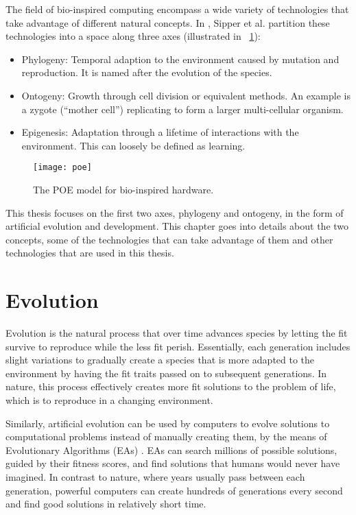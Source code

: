The field of bio-inspired computing encompass a wide variety of technologies that take advantage of different natural concepts.
In \cite{sipper1997poe}, Sipper et al. partition these technologies into a space along three axes (illustrated in \figurename~\ref{fig:poe}):

\begin{itemize}
    \item
    Phylogeny:
    Temporal adaption to the environment caused by mutation and reproduction.
    It is named after the evolution of the species.
    \item
    Ontogeny:
    Growth through cell division or equivalent methods.
    An example is a zygote (``mother cell'') replicating to form a larger multi-cellular organism.
    \item
    Epigenesis:
    Adaptation through a lifetime of interactions with the environment.
    This can loosely be defined as learning.
\end{itemize}

\begin{figure}[!ht]
    \centering
    \texttt{[image: poe]}
    \caption[POE model]{
        The POE model for bio-inspired hardware.
    }
    \label{fig:poe}
\end{figure}

This thesis focuses on the first two axes, phylogeny and ontogeny, in the form of artificial evolution and development.
This chapter goes into details about the two concepts, some of the technologies that can take advantage of them and other technologies that are used in this thesis.


\section{Evolution}

Evolution is the natural process that over time advances species by letting the fit survive to reproduce while the less fit perish.
Essentially, each generation includes slight variations to gradually create a species that is more adapted to the environment by having the fit traits passed on to subsequent generations.
In nature, this process effectively creates more fit solutions to the problem of life, which is to reproduce in a changing environment.

Similarly, artificial evolution can be used by computers to evolve solutions to computational problems instead of manually creating them, by the means of Evolutionary Algorithms (EAs) \cite{holland1992adaptation}.
EAs can search millions of possible solutions, guided by their fitness scores, and find solutions that humans would never have imagined.
In contrast to nature, where years usually pass between each generation, powerful computers can create hundreds of generations every second and find good solutions in relatively short time.

